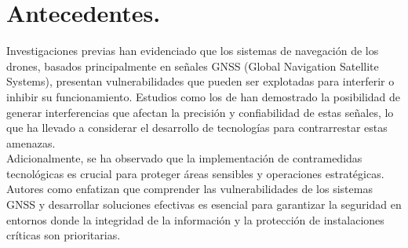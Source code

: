 \chapter*{Antecedentes.}

\begin{justify}
    
    Investigaciones previas han evidenciado que los sistemas de navegación de los drones, basados principalmente en señales GNSS
    (Global Navigation Satellite Systems), presentan vulnerabilidades que pueden ser explotadas para interferir o
    inhibir su funcionamiento. Estudios como los de \textcite{shepard2012evaluation} han demostrado la posibilidad de generar interferencias
    que afectan la precisión y confiabilidad de estas señales, lo que ha llevado a considerar el desarrollo de tecnologías para
    contrarrestar estas amenazas.\\
    
    \noindent Adicionalmente, se ha observado que la implementación de contramedidas tecnológicas es crucial para proteger áreas sensibles y
    operaciones estratégicas. Autores como \textcite{tippenhauer2011requirements} enfatizan que comprender las vulnerabilidades de los sistemas GNSS
    y desarrollar soluciones efectivas es esencial para garantizar la seguridad en entornos donde la integridad de la información y
    la protección de instalaciones críticas son prioritarias.

\end{justify}
